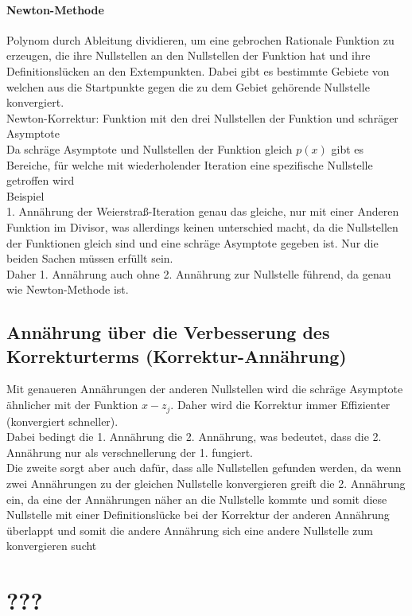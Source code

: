 \documentclass[12pt]{article}
\begin{document}
\paragraph{Newton-Methode}
Polynom durch Ableitung dividieren, um eine gebrochen Rationale Funktion zu erzeugen, die ihre Nullstellen an den Nullstellen der Funktion hat und ihre Definitionslücken an den Extempunkten. Dabei gibt es bestimmte Gebiete von welchen aus die Startpunkte gegen die zu dem Gebiet gehörende Nullstelle konvergiert.
\\
Newton-Korrektur: Funktion mit den drei Nullstellen der Funktion und schräger Asymptote
\\
Da schräge Asymptote und Nullstellen der Funktion gleich $p(x)$ gibt es Bereiche, für welche mit wiederholender Iteration eine spezifische Nullstelle getroffen wird
\\
Beispiel
\\
1. Annährung der Weierstraß-Iteration genau das gleiche, nur mit einer Anderen Funktion im Divisor, was allerdings keinen unterschied macht, da die Nullstellen der Funktionen gleich sind und eine schräge Asymptote gegeben ist. Nur die beiden Sachen müssen erfüllt sein.
\\
Daher 1. Annährung auch ohne 2. Annährung zur Nullstelle führend, da genau wie Newton-Methode ist.

\subsection*{Annährung über die Verbesserung des Korrekturterms (Korrektur-Annährung)}

Mit genaueren Annährungen der anderen Nullstellen wird die schräge Asymptote ähnlicher mit der Funktion $x-z_j$. Daher wird die Korrektur immer Effizienter (konvergiert schneller).
\\
Dabei bedingt die 1. Annährung die 2. Annährung, was bedeutet, dass die 2. Annährung nur als verschnellerung der 1. fungiert.
\\
Die zweite sorgt aber auch dafür, dass alle Nullstellen gefunden werden, da wenn zwei Annährungen zu der gleichen Nullstelle konvergieren greift die 2. Annährung ein, da eine der Annährungen näher an die Nullstelle kommte und somit diese Nullstelle mit einer Definitionslücke bei der Korrektur der anderen Annährung überlappt und somit die andere Annährung sich eine andere Nullstelle zum konvergieren sucht

\section*{???}
\end{document}
